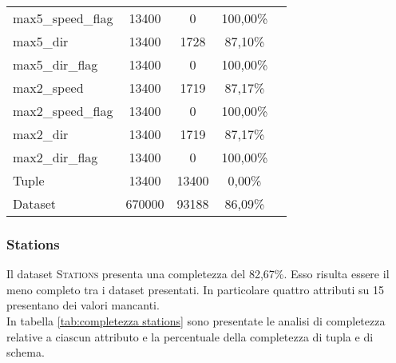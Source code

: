 \begin{longtable}{lcccc}
		max5\_speed\_flag	& 13400 & 0		   	 & 100,00\%		\\		
		max5\_dir			& 13400 & 1728		 & 87,10\%		\\
		max5\_dir\_flag		& 13400 & 0		   	 & 100,00\%		\\	
		max2\_speed			& 13400 & 1719		 & 87,17\%		\\	
		max2\_speed\_flag	& 13400 & 0		   	 & 100,00\%		\\		
		max2\_dir			& 13400 & 1719		 & 87,17\%		\\
		max2\_dir\_flag		& 13400 & 0		   	 & 100,00\%		\\	
		\midrule
		Tuple 			& 13400  &	13400	 & 0,00\%		\\
		Dataset  		& 670000 &	93188 	 & 86,09\%		\\
		\bottomrule
		
	\end{longtable}
	\label{tab:completezza weather}

\subsubsection*{Stations}
Il dataset \textsc{Stations} presenta una completezza del 82,67\%. Esso risulta essere il meno completo tra i dataset presentati. In particolare quattro attributi su 15 presentano dei valori mancanti.\\
In tabella \ref{tab:completezza stations} sono presentate le analisi di completezza relative a ciascun attributo e la percentuale della completezza di tupla e di schema.

